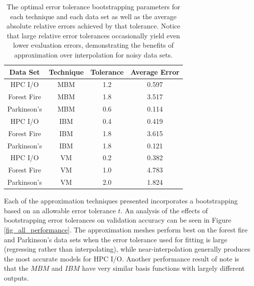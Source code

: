 \begin{table}
  \centering
  \begin{tabular}{c|c|c|c}
    \hline
    \textbf{Data Set} & \textbf{Technique} & \textbf{Tolerance} & \textbf{Average Error}\\
    \hline
    HPC I/O & MBM & 1.2 & 0.597\\
    Forest Fire & MBM & 1.8 & 3.517\\
    Parkinson's & MBM & 0.6 & 0.114\\
    \hline
    HPC I/O & IBM & 0.4 & 0.419\\
    Forest Fire & IBM & 1.8 & 3.615\\
    Parkinson's & IBM & 1.8 & 0.121\\
    \hline
    HPC I/O & VM & 0.2 & 0.382\\
    Forest Fire & VM & 1.0 & 4.783\\
    Parkinson's & VM & 2.0 & 1.824\\
    \hline
  \end{tabular}
  \caption{The optimal error tolerance bootstrapping parameters for each technique and each data set as well as the average absolute relative errors achieved by that tolerance. Notice that large relative error tolerances occasionally yield even lower evaluation errors, demonstrating the benefits of approximation over interpolation for noisy data sets.
  \vspace{-1cm}}
  \label{tab_optimal_tolerance}
\end{table}

Each of the approximation techniques presented incorporates a bootstrapping based on an allowable error tolerance $t$. An analysis of the effects of bootstrapping error tolerances on validation accuracy can be seen in Figure \ref{fig_all_performance}. The approximation meshes perform best on the forest fire and Parkinson's data sets when the error tolerance used for fitting is large (regressing rather than interpolating), while near-interpolation generally produces the most accurate models for HPC I/O. Another performance result of note is that the $MBM$ and $IBM$ have very similar basis functions with largely different outputs.

